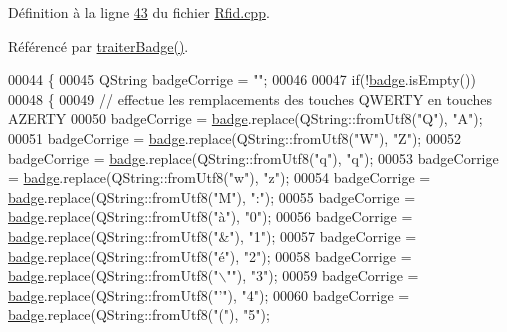 Définition à la ligne \hyperlink{_rfid_8cpp_source_l00043}{43} du fichier \hyperlink{_rfid_8cpp_source}{Rfid.\+cpp}.



Référencé par \hyperlink{_rfid_8cpp_source_l00097}{traiter\+Badge()}.


\begin{DoxyCode}
00044 \{
00045     QString badgeCorrige = \textcolor{stringliteral}{""};
00046 
00047     \textcolor{keywordflow}{if}(!\hyperlink{class_rfid_ac634cd26ffbe1c6da3967dc4af53b734}{badge}.isEmpty())
00048     \{
00049         \textcolor{comment}{// effectue les remplacements des touches QWERTY en touches AZERTY}
00050         badgeCorrige = \hyperlink{class_rfid_ac634cd26ffbe1c6da3967dc4af53b734}{badge}.replace(QString::fromUtf8(\textcolor{stringliteral}{"Q"}), \textcolor{stringliteral}{"A"});
00051         badgeCorrige = \hyperlink{class_rfid_ac634cd26ffbe1c6da3967dc4af53b734}{badge}.replace(QString::fromUtf8(\textcolor{stringliteral}{"W"}), \textcolor{stringliteral}{"Z"});
00052         badgeCorrige = \hyperlink{class_rfid_ac634cd26ffbe1c6da3967dc4af53b734}{badge}.replace(QString::fromUtf8(\textcolor{stringliteral}{"q"}), \textcolor{stringliteral}{"q"});
00053         badgeCorrige = \hyperlink{class_rfid_ac634cd26ffbe1c6da3967dc4af53b734}{badge}.replace(QString::fromUtf8(\textcolor{stringliteral}{"w"}), \textcolor{stringliteral}{"z"});
00054         badgeCorrige = \hyperlink{class_rfid_ac634cd26ffbe1c6da3967dc4af53b734}{badge}.replace(QString::fromUtf8(\textcolor{stringliteral}{"M"}), \textcolor{stringliteral}{":"});
00055         badgeCorrige = \hyperlink{class_rfid_ac634cd26ffbe1c6da3967dc4af53b734}{badge}.replace(QString::fromUtf8(\textcolor{stringliteral}{"à"}), \textcolor{stringliteral}{"0"});
00056         badgeCorrige = \hyperlink{class_rfid_ac634cd26ffbe1c6da3967dc4af53b734}{badge}.replace(QString::fromUtf8(\textcolor{stringliteral}{"&"}), \textcolor{stringliteral}{"1"});
00057         badgeCorrige = \hyperlink{class_rfid_ac634cd26ffbe1c6da3967dc4af53b734}{badge}.replace(QString::fromUtf8(\textcolor{stringliteral}{"é"}), \textcolor{stringliteral}{"2"});
00058         badgeCorrige = \hyperlink{class_rfid_ac634cd26ffbe1c6da3967dc4af53b734}{badge}.replace(QString::fromUtf8(\textcolor{stringliteral}{"\(\backslash\)""}), \textcolor{stringliteral}{"3"});
00059         badgeCorrige = \hyperlink{class_rfid_ac634cd26ffbe1c6da3967dc4af53b734}{badge}.replace(QString::fromUtf8(\textcolor{stringliteral}{"'"}), \textcolor{stringliteral}{"4"});
00060         badgeCorrige = \hyperlink{class_rfid_ac634cd26ffbe1c6da3967dc4af53b734}{badge}.replace(QString::fromUtf8(\textcolor{stringliteral}{"("}), \textcolor{stringliteral}{"5"});

\end{DoxyCode}

